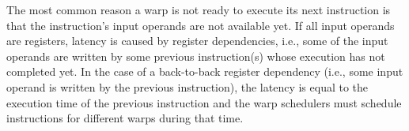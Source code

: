 	The most common reason a warp is not ready to execute its next instruction is that the instruction's input operands are not available yet.
	If all input operands are registers, latency is caused by register dependencies, i.e., some
	of the input operands are written by some previous instruction(s) whose execution has
	not completed yet. In the case of a back-to-back register dependency (i.e., some input
	operand is written by the previous instruction), the latency is equal to the execution
	time of the previous instruction and the warp schedulers must schedule instructions for
	different warps during that time.
	
